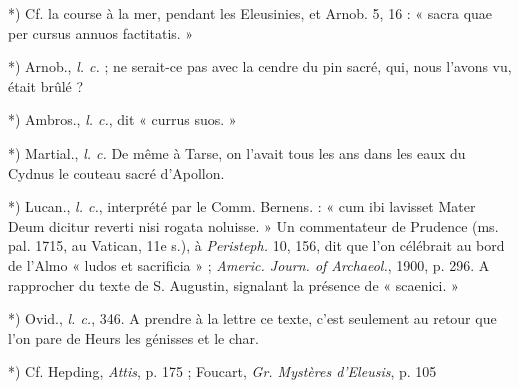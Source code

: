 \documentclass[a4paper, 11pt, oneside, polutonikogreek, french]{article}
\begin{document}
*) Cf. la course à la mer, pendant les Eleusinies, et Arnob. 5, 16 : « sacra quae per cursus annuos factitatis. »

*) Arnob., \emph{l. c.} ; ne serait-ce pas avec la cendre du pin sacré, qui, nous l'avons vu, était brûlé ?

*) Ambros., \emph{l. c.}, dit « currus suos. »

*) Martial., \emph{l. c.} De même à Tarse, on l'avait tous les ans dans les eaux du Cydnus le couteau sacré d'Apollon.

*) Lucan., \emph{l. c.}, interprété par le Comm. Bernens. : « cum ibi lavisset Mater Deum dicitur reverti nisi rogata noluisse. » Un commentateur de Prudence (ms. pal. 1715, au Vatican, 11e s.), à \emph{Peristeph.} 10, 156, dit que l'on célébrait au bord de l'Almo « ludos et sacrificia » ; \emph{Americ. Journ. of Archaeol.}, 1900, p. 296. A rapprocher du texte de S. Augustin, signalant la présence de « scaenici. »

*) Ovid., \emph{l. c.}, 346. A prendre à la lettre ce texte, c'est seulement au retour que l'on pare de Heurs les génisses et le char.

*) Cf. Hepding, \emph{Attis}, p. 175 ; Foucart, \emph{Gr. Mystères d'Eleusis}, p. 105
\end{document}
